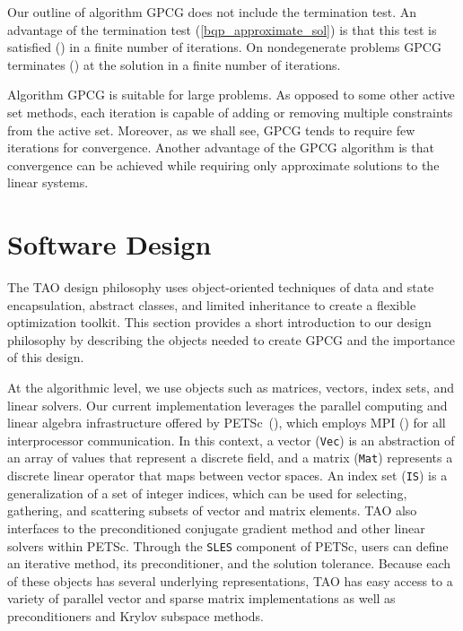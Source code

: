 \documentclass{esub2acm}
\newcommand{\Ref}[1]{\mbox{\rm{(\ref{#1})}}}
\begin{document}
Our outline of algorithm GPCG does not include the termination test.
An advantage of the termination test \Ref{bqp_approximate_sol} is 
that this test is satisfied ()
in a finite number of iterations.
On nondegenerate problems GPCG terminates ()
at the solution in a finite number of iterations.

Algorithm GPCG is suitable for large problems.
As opposed to some other active set methods,
each iteration is capable of
adding or removing multiple constraints from the active set.
Moreover, as we shall see, GPCG tends to require few iterations
for convergence.
Another advantage of the GPCG algorithm is that convergence
can be achieved while requiring only approximate solutions
to the linear systems.



\section{Software Design} \label{design}

The TAO design philosophy uses object-oriented techniques of data and
state encapsulation, abstract classes, and limited inheritance to
create a flexible optimization toolkit.  This section provides a short
introduction to our design philosophy by describing the objects needed
to create GPCG and the importance of this design.   

At the algorithmic level, we use objects such as matrices, vectors, 
index sets, and linear solvers.  
Our current implementation leverages the parallel computing
and linear algebra infrastructure offered by 
PETSc~(),
which employs MPI () for all interprocessor communication.
In this context, a vector (\texttt {Vec}) is an abstraction of an
array of values that represent a discrete field, and a matrix
(\texttt {Mat}) represents a discrete linear operator that maps
between vector spaces.  An index set (\texttt {IS}) is a
generalization of a set of integer indices, which can be used for
selecting, gathering, and scattering subsets of vector and matrix
elements.  TAO also interfaces to the preconditioned conjugate gradient 
method and other linear solvers within
PETSc.  Through the \texttt{SLES} component of PETSc, users can define an iterative method,
its preconditioner, and the solution tolerance.
Because each of these objects has several underlying 
representations, TAO has easy access to a variety of parallel vector
and sparse matrix implementations as well as preconditioners and
Krylov subspace methods.
\end{document}
